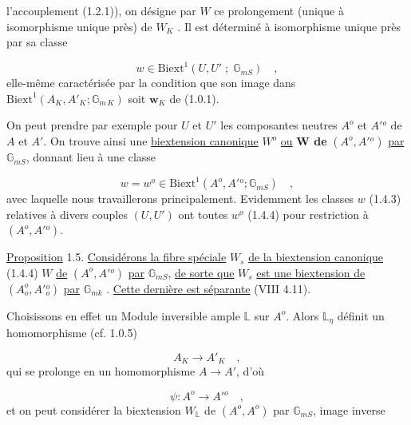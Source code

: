 
l'accouplement (1.2.1)), on désigne par $W$ ce prolongement (unique à isomorphisme unique près) de $W_K$ . Il est déterminé à isomorphisme unique près par sa classe

\begin{equation}\tag{1.4.3}
w \in \mathrm{Biext}^1(U,U' \; ; \; \mathbb{G}_{mS}) \quad ,
\end{equation}
elle-même caractérisée par la condition que son image dans $\mathrm{Biext}^1(A_K,A'_K;\mathbb{G}_{m\,K})$ soit $\mathbf{w}_K$ de (1.0.1).

On peut prendre par exemple pour $U$ et $U'$ les composantes neutres $A^o$ et $A'{}^o$ de $A$ et $A'$. On trouve ainsi une \underline{biextension canonique} $W^o$ \underline{ou} \textbf{W de} $(A^o,A'{}^o)$ \underline{par} $\mathbb{G}_{mS}$, donnant lieu à une classe

\begin{equation}\tag{1.4.4}
w = w^o \in \mathrm{Biext}^1(A^o,A'{}^o;\mathbb{G}_{mS}) \quad ,
\end{equation}
avec laquelle nous travaillerons principalement. Evidemment les classes $w$ (1.4.3) relatives à divers couples $(U,U')$ ont toutes $w^o$ (1.4.4) pour restriction à $(A^o,A'{}^o)$.

\underline{Proposition} 1.5. \underline{Considérons la fibre spéciale} $W_s$ \underline{de la biextension canonique} (1.4.4) $W$ \underline{de} $(A^o,A'{}^o)$ \underline{par} $\mathbb{G}_{mS}$, \underline{de sorte que} $W_s$ \underline{est une biextension de} $(A^o_o,A'{}^o_o)$ \underline{par} $\mathbb{G}_{mk}$ . \underline{Cette dernière est séparante} (VIII 4.11).

Choisissons en effet un Module inversible ample $\mathbb{L}$ sur $A^o$. Alors $\mathbb{L}_\eta$ définit un homomorphisme (cf. 1.0.5)

\begin{equation*}
A_K \longrightarrow A'_K \quad ,
\end{equation*}
qui se prolonge en un homomorphisme $A \longrightarrow A'$, d'où

\begin{equation*}
\psi : A^o \longrightarrow A'{}^o \quad ,
\end{equation*}
et on peut considérer la biextension $W_{\mathbb{L}}$ de $(A^o,A^o)$ par $\mathbb{G}_{mS}$, image inverse



